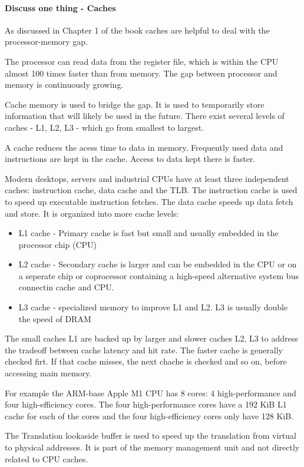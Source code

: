 \documentclass[runningheads]{llncs}
\begin{document}
\paragraph{Discuss one thing - Caches}
As discussed in Chapter 1 of the book caches are helpful to deal with the processor-memory gap. 

The processor can read data from the register file, which is within the CPU almost 100 times faster than from memory. The gap between processor and memory is continuously growing. 

Cache memory is used to bridge the gap. It is used to temporarily store information that will likely be used in the future. There exist several levels of caches -  L1, L2, L3 - which go from smallest to largest. 

A cache reduces the acess time to data in memory. Frequently used data and instructions are kept in the cache. Access to data kept there is faster.

Modern desktops, servers and industrial CPUs have at least three independent caches: instruction cache, data cache and the TLB. The instruction cache is used to speed up executable instruction fetches. The data cache speeds up data fetch and store. It is organized into more cache levels:
\begin{itemize}
	\item L1 cache - Primary cache is fast but small and usually embedded in the processor chip (CPU)
	\item L2 cache - Secondary cache is larger and can be embedded in the CPU or on a seperate chip or coprocessor containing a high-speed alternative system bus connectin cache and CPU.
	\item L3 cache - specialized memory to improve L1 and L2. L3 is usually double the speed of DRAM
\end{itemize}
The small caches L1 are backed up by larger and slower caches L2, L3 to address the tradeoff between cache latency and hit rate. The faster cache is generally checked firt. If that cache misses, the next chache is checked and so on, before accessing main memory.

For example the ARM-base Apple M1 CPU has 8 cores: 4 high-performance and four high-efficiency cores. The four high-performance cores have a 192 KiB L1 cache for each of the cores and the four high-efficiency cores only have 128 KiB.

The Translation lookaside buffer is used to speed up the translation from virtual to physical addresses. It is part of the memory management unit and not directly related to CPU caches.
\end{document}
